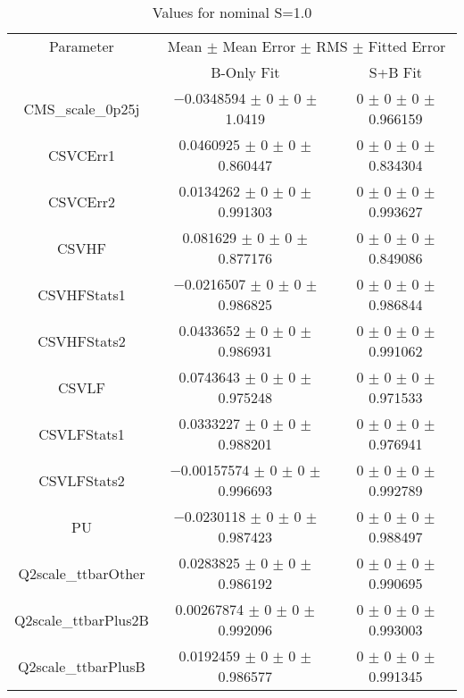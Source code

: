 \begin{table}
\centering
\caption{Values for nominal S=1.0}
\begin{tabular}{ccc}
\toprule
Parameter & \multicolumn{2}{c}{Mean $\pm$ Mean Error $\pm$ RMS $\pm$ Fitted Error}\\
 & B-Only Fit & S+B Fit\\
\midrule
CMS\_scale\_0p25j & \num{-0.0348594} $\pm$ \num{0} $\pm$ \num{0} $\pm$ \num{1.0419} & \num{0} $\pm$ \num{0} $\pm$ \num{0} $\pm$ \num{0.966159}\\
CSVCErr1 & \num{0.0460925} $\pm$ \num{0} $\pm$ \num{0} $\pm$ \num{0.860447} & \num{0} $\pm$ \num{0} $\pm$ \num{0} $\pm$ \num{0.834304}\\
CSVCErr2 & \num{0.0134262} $\pm$ \num{0} $\pm$ \num{0} $\pm$ \num{0.991303} & \num{0} $\pm$ \num{0} $\pm$ \num{0} $\pm$ \num{0.993627}\\
CSVHF & \num{0.081629} $\pm$ \num{0} $\pm$ \num{0} $\pm$ \num{0.877176} & \num{0} $\pm$ \num{0} $\pm$ \num{0} $\pm$ \num{0.849086}\\
CSVHFStats1 & \num{-0.0216507} $\pm$ \num{0} $\pm$ \num{0} $\pm$ \num{0.986825} & \num{0} $\pm$ \num{0} $\pm$ \num{0} $\pm$ \num{0.986844}\\
CSVHFStats2 & \num{0.0433652} $\pm$ \num{0} $\pm$ \num{0} $\pm$ \num{0.986931} & \num{0} $\pm$ \num{0} $\pm$ \num{0} $\pm$ \num{0.991062}\\
CSVLF & \num{0.0743643} $\pm$ \num{0} $\pm$ \num{0} $\pm$ \num{0.975248} & \num{0} $\pm$ \num{0} $\pm$ \num{0} $\pm$ \num{0.971533}\\
CSVLFStats1 & \num{0.0333227} $\pm$ \num{0} $\pm$ \num{0} $\pm$ \num{0.988201} & \num{0} $\pm$ \num{0} $\pm$ \num{0} $\pm$ \num{0.976941}\\
CSVLFStats2 & \num{-0.00157574} $\pm$ \num{0} $\pm$ \num{0} $\pm$ \num{0.996693} & \num{0} $\pm$ \num{0} $\pm$ \num{0} $\pm$ \num{0.992789}\\
PU & \num{-0.0230118} $\pm$ \num{0} $\pm$ \num{0} $\pm$ \num{0.987423} & \num{0} $\pm$ \num{0} $\pm$ \num{0} $\pm$ \num{0.988497}\\
Q2scale\_ttbarOther & \num{0.0283825} $\pm$ \num{0} $\pm$ \num{0} $\pm$ \num{0.986192} & \num{0} $\pm$ \num{0} $\pm$ \num{0} $\pm$ \num{0.990695}\\
Q2scale\_ttbarPlus2B & \num{0.00267874} $\pm$ \num{0} $\pm$ \num{0} $\pm$ \num{0.992096} & \num{0} $\pm$ \num{0} $\pm$ \num{0} $\pm$ \num{0.993003}\\
Q2scale\_ttbarPlusB & \num{0.0192459} $\pm$ \num{0} $\pm$ \num{0} $\pm$ \num{0.986577} & \num{0} $\pm$ \num{0} $\pm$ \num{0} $\pm$ \num{0.991345}\\

\end{tabular}
\end{table}
